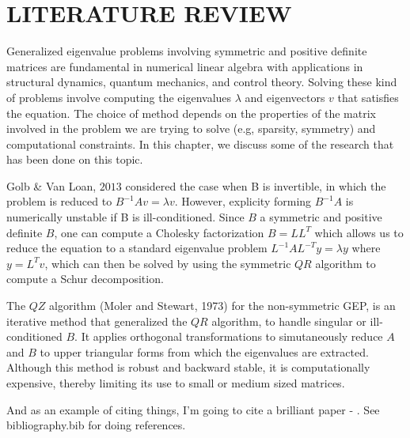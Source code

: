 \chapter{LITERATURE REVIEW}

Generalized eigenvalue problems involving symmetric and positive definite matrices are fundamental in numerical linear algebra with applications in structural  dynamics, quantum mechanics, and control theory. Solving these kind of problems involve computing the eigenvalues $\lambda$ and eigenvectors $v$ that satisfies the equation. The choice of method depends on the properties of the matrix involved in the problem we are trying to solve (e.g, sparsity, symmetry) and computational constraints. In this chapter, we discuss some of the research that has been done on this topic.\par
Golb \& Van Loan, $2013$ considered the case when B is invertible, in which the problem is reduced to $B^{-1}Av = \lambda v$. However, explicity forming $B^{-1}A$ is numerically unstable if B is ill-conditioned. Since $B$ a symmetric and positive definite $B$, one can compute a Cholesky factorization $B = LL^{T}$ which allows us to  reduce the equation to a standard eigenvalue problem $L^{-1}AL^{-T}y = \lambda y$ where $y= L^T v$, which can then be solved by using the symmetric $QR$ algorithm to compute a Schur decomposition.\par
The $QZ$ algorithm (Moler and Stewart, 1973) for the non-symmetric GEP, is an iterative method that generalized the $QR$ algorithm, to handle singular or ill-conditioned $B$. It applies orthogonal transformations to simutaneously reduce $A$ and $B$ to upper triangular forms from which the eigenvalues are extracted. Although this method is robust and backward stable, it is computationally expensive, thereby limiting its use to small or medium sized matrices.\par

And as an example of citing things, I'm going to cite a brilliant paper - \citep{jones_2016}. See bibliography.bib for doing references.

